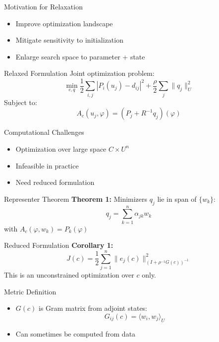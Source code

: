 \documentclass{beamer}
\begin{document}
\begin{frame}{Motivation for Relaxation}
\begin{itemize}
  \item Improve optimization landscape
  \item Mitigate sensitivity to initialization
  \item Enlarge search space to parameter + state
\end{itemize}
\end{frame}

\begin{frame}{Relaxed Formulation}
Joint optimization problem:
\begin{equation*}
\min_{c, q} \frac{1}{2} \sum_{i,j} |P_i(u_j) - d_{ij}|^2 + \frac{\rho}{2} \sum_j \|q_j\|_U^2
\end{equation*}
Subject to:
\begin{equation*}
A_c(u_j, \varphi) = (P_j + R^{-1}q_j)(\varphi)
\end{equation*}
\end{frame}

\begin{frame}{Computational Challenges}
\begin{itemize}
  \item Optimization over large space $C \times U^n$
  \item Infeasible in practice
  \item Need reduced formulation
\end{itemize}
\end{frame}

\begin{frame}{Representer Theorem}
\textbf{Theorem 1:} Minimizers $q_j$ lie in span of $\{w_k\}$:
\begin{equation*}
q_j = \sum_{k=1}^n \alpha_{jk} w_k
\end{equation*}
with $A_c(\varphi, w_k) = P_k(\varphi)$
\end{frame}

\begin{frame}{Reduced Formulation}
\textbf{Corollary 1:}
\begin{equation*}
J(c) = \frac{1}{2} \sum_{j=1}^n \|e_j(c)\|_{(I + \rho^{-1} G(c))^{-1}}^2
\end{equation*}
This is an unconstrained optimization over $c$ only.
\end{frame}

\begin{frame}{Metric Definition}
\begin{itemize}
  \item $G(c)$ is Gram matrix from adjoint states:
\begin{equation*}
G_{ij}(c) = \langle w_i, w_j \rangle_U
\end{equation*}
  \item Can sometimes be computed from data
\end{itemize}
\end{frame}
\end{document}
